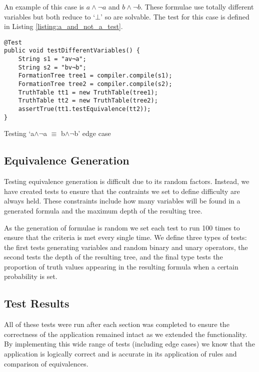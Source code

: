 \documentclass[draft]{report}
\begin{document}
An example of this case is $a\land\lnot a$ and $b\land\lnot b$. These formulae use totally different variables but both reduce to `$\bot$' so are solvable. The test for this case is defined in Listing \ref{listing:a_and_not_a_test}.

\begin{listing}[ht]
\begin{verbatim}
@Test
public void testDifferentVariables() {
    String s1 = "av¬a";
    String s2 = "bv¬b";
    FormationTree tree1 = compiler.compile(s1);
    FormationTree tree2 = compiler.compile(s2);
    TruthTable tt1 = new TruthTable(tree1);
    TruthTable tt2 = new TruthTable(tree2);
    assertTrue(tt1.testEquivalence(tt2));
}
\end{verbatim}
\caption{Testing `a$\land\lnot$a $\equiv$ b$\land\lnot$b' edge case}
\label{listing:a_and_not_a_test}
\end{listing}

\subsection{Equivalence Generation}

Testing equivalence generation is difficult due to its random factors. Instead, we have created tests to ensure that the contraints we set to define difficulty are always held. These constraints include how many variables will be found in a generated formula and the maximum depth of the resulting tree.

As the generation of formulae is random we set each test to run 100 times to ensure that the criteria is met every single time. We define three types of tests: the first tests generating variables and random binary and unary operators, the second tests the depth of the resulting tree, and the final type tests the proportion of truth values appearing in the resulting formula when a certain probability is set.

\subsection{Test Results}

All of these tests were run after each section was completed to ensure the correctness of the application remained intact as we extended the functionality. By implementing this wide range of tests (including edge cases) we know that the application is logically correct and is accurate in its application of rules and comparison of equivalences.
\end{document}
